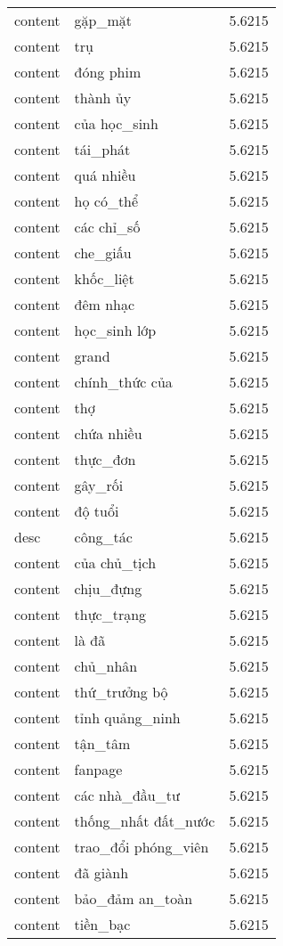 \documentclass{article}
\begin{document}
\begin{tabular}{lll}
content & gặp\_mặt & 5.6215\\
content & trụ & 5.6215\\
content & đóng phim & 5.6215\\
content & thành ủy & 5.6215\\
content & của học\_sinh & 5.6215\\
content & tái\_phát & 5.6215\\
content & quá nhiều & 5.6215\\
content & họ có\_thể & 5.6215\\
content & các chỉ\_số & 5.6215\\
content & che\_giấu & 5.6215\\
content & khốc\_liệt & 5.6215\\
content & đêm nhạc & 5.6215\\
content & học\_sinh lớp & 5.6215\\
content & grand & 5.6215\\
content & chính\_thức của & 5.6215\\
content & thợ & 5.6215\\
content & chứa nhiều & 5.6215\\
content & thực\_đơn & 5.6215\\
content & gây\_rối & 5.6215\\
content & độ tuổi & 5.6215\\
desc & công\_tác & 5.6215\\
content & của chủ\_tịch & 5.6215\\
content & chịu\_đựng & 5.6215\\
content & thực\_trạng & 5.6215\\
content & là đã & 5.6215\\
content & chủ\_nhân & 5.6215\\
content & thứ\_trưởng bộ & 5.6215\\
content & tỉnh quảng\_ninh & 5.6215\\
content & tận\_tâm & 5.6215\\
content & fanpage & 5.6215\\
content & các nhà\_đầu\_tư & 5.6215\\
content & thống\_nhất đất\_nước & 5.6215\\
content & trao\_đổi phóng\_viên & 5.6215\\
content & đã giành & 5.6215\\
content & bảo\_đảm an\_toàn & 5.6215\\
content & tiền\_bạc & 5.6215\\

\end{tabular}
\end{document}

